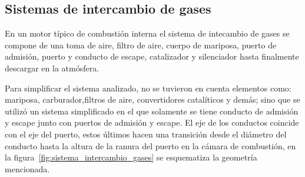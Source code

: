 %
%
%
%
%


\subsection{Sistemas de intercambio de gases}
%
En un motor típico de combustión interna el sistema de intecambio de gases se
compone de una toma de aire, filtro de aire, cuerpo de mariposa, puerto de
admisión, puerto y conducto de escape, catalizador y silenciador hasta
finalmente descargar en la atmósfera.

Para simplificar el sistema analizado, no se tuvieron en cuenta elementos como:
mariposa, carburador,filtros de aire, convertidores catalíticos y demás;  sino
que se utilizó un sistema simplificado en el que solamente se tiene conducto de
admisión y escape junto con puertos de admisión y escape.
%
El eje de los conductos coincide con el eje del puerto, estos últimos hacen una
transición desde el diámetro del conducto hasta la altura de la ranura del
puerto en la cámara de combustión, en la
figura~\ref{fig:sistema_intercambio_gases} se esquematiza la geometría
mencionada.

